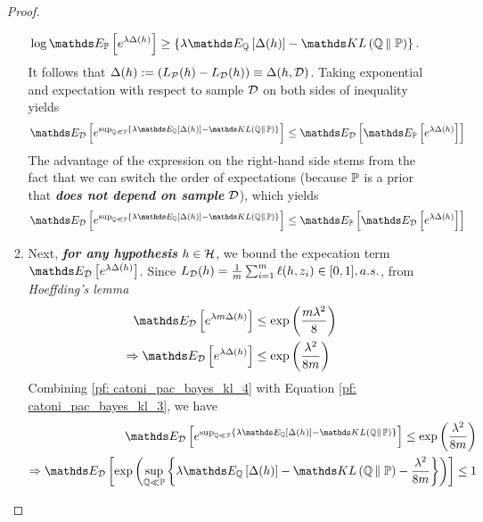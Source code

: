 \documentclass[11pt]{article}
\begin{document}
\begin{itemize}
\begin{proof}
\begin{enumerate}
\begin{align}
\log \E{\bP}{e^{\lambda \Delta(h)}} &\ge \set{ \lambda \E{\bQ}{\Delta(h)} - \kl{\bQ}{\bP} }. \label{pf: catoni_pac_bayes_kl_1}
\end{align} It follows that $\Delta(h) := \left(L_{{\mathcal P}}(h) - L_{{\mathcal D}}(h)\right) \equiv \Delta(h, {\mathcal D})$. Taking exponential and expectation with respect to sample ${\mathcal D}$ on both sides of inequality yields
\begin{align}
\E{\cD}{e^{\sup_{\bQ \ll \bP}\set{\lambda\E{\bQ}{\Delta(h)} - \kl{\bQ}{\bP} }}} &\le \E{\cD}{\E{\bP}{e^{\lambda \Delta(h)}}} \label{pf: catoni_pac_bayes_kl_2}
\end{align}
The advantage of the expression on the right-hand side stems from the fact that we can switch the order of expectations (because ${\mathbb P}$ is a prior that \emph{\textbf{does not depend on sample}} ${\mathcal D}$), which yields
\begin{align}
\E{\cD}{e^{\sup_{\bQ \ll \bP}\set{\lambda\E{\bQ}{\Delta(h)} - \kl{\bQ}{\bP} }}} &\le \E{\bP}{\E{\cD}{e^{\lambda \Delta(h)}}} \label{pf: catoni_pac_bayes_kl_3}
\end{align}

\item Next, \emph{\textbf{for any hypothesis}} $h\in {\mathcal H}$, we bound the expecation term $\E{\cD}{e^{\lambda \Delta(h)}}$. Since $L_{{\mathcal D}}(h) = \frac{1}{m}\sum_{i=1}^{m}\ell(h, z_i) \in [0,1], a.s.$,  from \emph{Hoeffding's lemma}  
\begin{align}
\E{\cD}{e^{\lambda m \Delta(h)}} &\le \exp\paren{\frac{ m \lambda^2 }{8}} \nonumber\\
\Rightarrow \E{\cD}{e^{\lambda  \Delta(h)}} &\le \exp\paren{\frac{\lambda^2}{8m}} \label{pf: catoni_pac_bayes_kl_4}
\end{align} Combining \eqref{pf: catoni_pac_bayes_kl_4} with Equation \eqref{pf: catoni_pac_bayes_kl_3}, we have
\begin{align}
\E{\cD}{e^{\sup_{\bQ \ll \bP}\set{\lambda\E{\bQ}{\Delta(h)} - \kl{\bQ}{\bP}  }}}  \le  \exp\paren{\frac{\lambda^2 }{8m}} \nonumber\\
\Rightarrow \E{\cD}{\exp\paren{\sup_{\bQ \ll \bP}\set{\lambda\E{\bQ}{\Delta(h)} - \kl{\bQ}{\bP} - \frac{\lambda^2 }{8m}  }}} \le 1  \label{pf: catoni_pac_bayes_kl_5}
\end{align}


\end{enumerate}
\end{proof}
\end{itemize}
\end{document}
